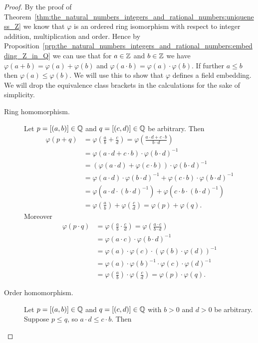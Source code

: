\documentclass[../main.tex]{subfiles}
\begin{document}
\begin{proof}
    By the proof of Theorem~\ref{thm:the_natural_numbers_integers_and_rational_numbers:uniqueness_Z} we know that $\varphi$ is an ordered ring isomorphism with respect to integer addition, multiplication and order. Hence by Proposition~\ref{prp:the_natural_numbers_integers_and_rational_numbers:embedding_Z_in_Q} we can use that for $a\in\mathbb{Z}$ and $b\in\mathbb{Z}$ we have $\varphi(a+b)=\varphi(a)+\varphi(b)$ and $\varphi(a\cdot b)=\varphi(a)\cdot\varphi(b)$. If further $a\leq b$ then $\varphi(a)\leq\varphi(b)$. We will use this to show that $\varphi$ defines a field embedding. We will drop the equivalence class brackets in the calculations for the sake of simplicity.
    \begin{description}
        \item[Ring homomorphism.] Let $p=[(a,b)]\in\mathbb{Q}$ and $q=[(c,d)]\in\mathbb{Q}$ be arbitrary. Then
        \begin{align*}
            \varphi(p+q) & =\varphi\left(\frac{a}{b}+\frac{c}{d}\right)=\varphi\left(\frac{a\cdot d+c\cdot b}{b\cdot d}\right) \\
            & =\varphi(a\cdot d+c\cdot b)\cdot\varphi(b\cdot d)^{-1} \\
            & =(\varphi(a\cdot d)+\varphi(c\cdot b))\cdot\varphi(b\cdot d)^{-1} \\
            & =\varphi(a\cdot d)\cdot\varphi(b\cdot d)^{-1}+\varphi(c\cdot b)\cdot\varphi(b\cdot d)^{-1} \\
            & =\varphi(a\cdot d\cdot(b\cdot d)^{-1})+\varphi(c\cdot b\cdot(b\cdot d)^{-1}) \\
            & =\varphi\left(\frac{a}{b}\right)+\varphi\left(\frac{c}{d}\right)=\varphi(p)+\varphi(q).
        \end{align*}
        Moreover
        \begin{align*}
            \varphi(p\cdot q) & =\varphi\left(\frac{a}{b}\cdot\frac{c}{d}\right)=\varphi\left(\frac{a\cdot c}{b\cdot d}\right) \\
            & =\varphi(a\cdot c)\cdot\varphi(b\cdot d)^{-1} \\
            & =\varphi(a)\cdot\varphi(c)\cdot(\varphi(b)\cdot\varphi(d))^{-1} \\
            & =\varphi(a)\cdot\varphi(b)^{-1}\cdot\varphi(c)\cdot\varphi(d)^{-1} \\
            & =\varphi\left(\frac{a}{b}\right)\cdot\varphi\left(\frac{c}{d}\right)=\varphi(p)\cdot\varphi(q).
        \end{align*}
        \item[Order homomorphism.] Let $p=[(a,b)]\in\mathbb{Q}$ and $q=[(c,d)]\in\mathbb{Q}$ with $b>0$ and $d>0$ be arbitrary. Suppose $p\leq q$, so $a\cdot d\leq c\cdot b$. Then

\end{description}
\end{proof}
\end{document}
